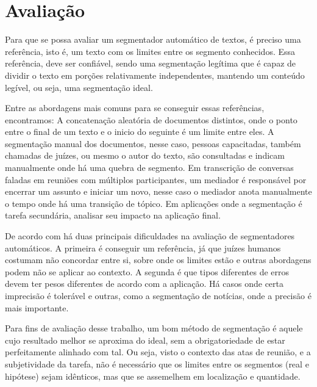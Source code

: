 
\section{Avaliação}
	\label{sec:avaliacao}



Para que se possa avaliar um segmentador automático de textos, é preciso uma referência, isto é, um texto com os limites entre os segmento conhecidos. Essa referência, deve ser confiável, sendo uma segmentação legítima que é capaz de dividir o texto em porções relativamente independentes, mantendo um conteúdo legível, ou seja, uma segmentação ideal.
%

Entre as abordagens mais comuns para se conseguir essas referências, encontramos: A concatenação aleatória de documentos distintos, onde o ponto entre o final de um texto e o inicio do seguinte é um limite entre eles. A segmentação manual dos documentos, nesse caso, pessoas capacitadas, também chamadas de juízes, ou mesmo o autor do texto, são consultadas e indicam manualmente onde há uma quebra de segmento. Em transcrição de conversas faladas em reuniões com múltiplos participantes, um mediador é responsável por encerrar um assunto e iniciar um novo, nesse caso o mediador anota manualmente o tempo onde há uma transição de tópico. Em aplicações onde a segmentação é tarefa secundária, analisar seu impacto na aplicação final.


De acordo com \cite{Pevzner2002} há duas principais dificuldades na avaliação de segmentadores automáticos. A primeira é conseguir um referência, já que juízes humanos costumam não concordar entre si, sobre onde os limites estão e outras abordagens podem não se aplicar ao contexto. A segunda é que tipos diferentes de erros devem ter pesos diferentes de acordo com a aplicação. Há casos onde certa imprecisão é tolerável e outras, como a segmentação de notícias, onde a precisão é mais importante.


Para fins de avaliação desse trabalho, um bom método de segmentação é aquele cujo resultado melhor se aproxima do ideal, sem a obrigatoriedade de estar perfeitamente alinhado com tal. Ou seja, visto o contexto das atas de reunião, e a subjetividade da tarefa, não é necessário que os limites entre os segmentos (real e hipótese) sejam idênticos, mas que se assemelhem em localização e quantidade.


